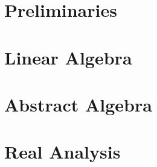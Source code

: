 \documentclass[11pt,a4paper]{book}
\newif\ifprelim
\newif\iflinalg
\newif\ifabsalg
\newif\ifranalysis
\newif\ifcanalysis
\newif\iftop
\newif\ifmisc
\begin{document}
\prelimtrue %
\linalgtrue %
\absalgtrue %
\ranalysistrue %
\canalysistrue %



\mainmatter
\ifprelim
    \part{Preliminaries}\label{part:prelim}
    
    
\else

\fi

\iflinalg
    \part{Linear Algebra}\label{part:linear-algebra}
    
    
    
    
    
\else

\fi

\ifabsalg
    \part{Abstract Algebra}\label{part:abstract-algebra}
    
    
    
    
\else

\fi

\ifranalysis
    \part{Real Analysis}\label{part:real-analysis}
    
    
    
    
    
    
    
    
\else

\fi
\end{document}
